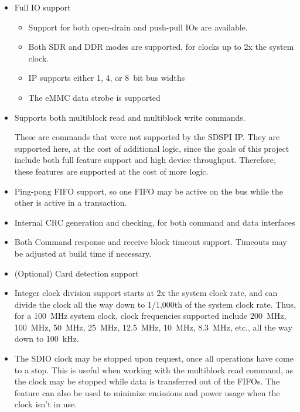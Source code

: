 \documentclass{gqtekspec}
\begin{document}
\begin{itemize}
\item Full IO support
	\begin{itemize}
	\item Support for both open-drain and push-pull IOs are available.
	\item Both SDR and DDR modes are supported, for clocks up
		to 2x the system clock.
	\item IP supports either 1, 4, or 8~bit bus widths
	\item The eMMC data strobe is supported
	\end{itemize}	

\item Supports both multiblock read and multiblock write commands.

	These are commands that were not supported by the SDSPI IP.  They
	are supported here, at the cost of additional logic, since the
	goals of this project include both full feature support and high
	device throughput.  Therefore, these features are supported at the
	cost of more logic.

\item Ping-pong FIFO support, so one FIFO may be active on the bus while the
	other is active in a transaction.

\item Internal CRC generation and checking, for both command and data
	interfaces

\item Both Command response and receive block timeout support.  Timeouts may
	be adjusted at build time if necessary.

\item (Optional) Card detection support

\item Integer clock division support starts at 2x the system clock rate,
	and can divide the clock all the way down to 1/1,000th of the system
	clock rate.  Thus, for a 100~MHz system clock, clock frequencies
	supported include 200~MHz, 100~MHz, 50~MHz, 25~MHz, 12.5~MHz, 10~MHz,
	8.3~MHz, etc.,  all the way down to 100~kHz.

\item The SDIO clock may be stopped upon request, once all operations have
	come to a stop.  This is useful when working with the multiblock read
	command, as the clock may be stopped while data is transferred out
	of the FIFOs.  The feature can also be used to minimize emissions
	and power usage when the clock isn't in use.


\end{itemize}
\end{document}
